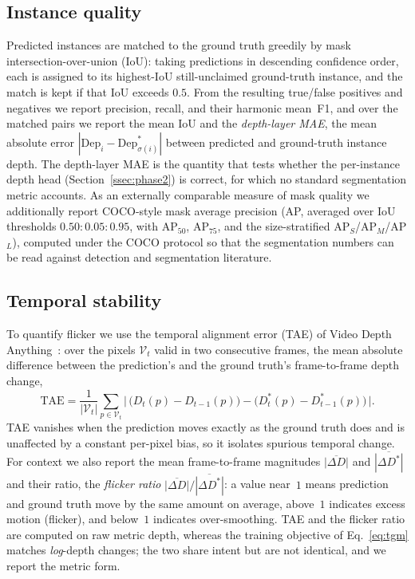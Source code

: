 \documentclass[sigconf, review=true]{acmart}
\newcommand{\tae}{\mathrm{TAE}}
\begin{document}
\subsection{Instance quality}
Predicted instances are matched to the ground truth greedily by mask
intersection-over-union (IoU): taking predictions in descending confidence
order, each is assigned to its highest-IoU still-unclaimed ground-truth
instance, and the match is kept if that IoU exceeds $0.5$. From the resulting
true/false positives and negatives we report precision, recall, and their
harmonic mean~F1, and over the matched pairs we report the mean IoU and the
\emph{depth-layer MAE}, the mean absolute error
$|\mathrm{Dep}_i-\mathrm{Dep}^{*}_{\sigma(i)}|$ between predicted and
ground-truth instance depth. The depth-layer MAE is the quantity that tests
whether the per-instance depth head (Section~\ref{ssec:phase2}) is correct, for
which no standard segmentation metric accounts. As an externally comparable
measure of mask quality we additionally report COCO-style mask average
precision (AP, averaged over IoU thresholds $0.50\!:\!0.05\!:\!0.95$, with
AP$_{50}$, AP$_{75}$, and the size-stratified AP$_{S}$/AP$_{M}$/AP$_{L}$),
computed under the COCO protocol so that the segmentation numbers can be read
against detection and segmentation literature.

\subsection{Temporal stability}
To quantify flicker we use the temporal alignment error (TAE) of Video Depth
Anything~\cite{chen2025vda}: over the pixels $\mathcal{V}_t$ valid in two
consecutive frames, the mean absolute difference between the prediction's and
the ground truth's frame-to-frame depth change,
\begin{equation}
\label{eq:taemetric}
\tae = \frac{1}{|\mathcal{V}_t|}\sum_{p\in\mathcal{V}_t}
\big|\,\big(D_t(p)-D_{t-1}(p)\big)-\big(D^{*}_t(p)-D^{*}_{t-1}(p)\big)\,\big| .
\end{equation}
TAE vanishes when the prediction moves exactly as the ground truth does and is
unaffected by a constant per-pixel bias, so it isolates spurious temporal
change. For context we also report the mean frame-to-frame magnitudes
$\overline{|\Delta D|}$ and $\overline{|\Delta D^{*}|}$ and their ratio, the
\emph{flicker ratio} $\overline{|\Delta D|}/\overline{|\Delta D^{*}|}$: a value
near~$1$ means prediction and ground truth move by the same amount on average,
above~$1$ indicates excess motion (flicker), and below~$1$ indicates
over-smoothing. TAE and the flicker ratio are computed on raw metric depth,
whereas the training objective of Eq.~\eqref{eq:tgm} matches \emph{log}-depth
changes; the two share intent but are not identical, and we report the metric
form.
\end{document}
